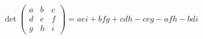 \documentclass[preview]{standalone}
\begin{document}
\begin{align*}
\det\begin{pmatrix} a & b & c \\ d & e & f \\ g & h & i \end{pmatrix} = aei + bfg + cdh - ceg - afh - bdi
\end{align*}
\end{document}
